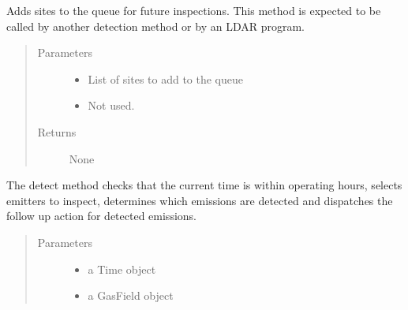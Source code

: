 \documentclass[letterpaper,10pt,english]{sphinxmanual}
\begin{document}
\begin{fulllineitems}
\begin{fulllineitems}
\label{\detokenize{index:feast.DetectionModules.comp_survey.CompSurvey.action}}
Adds sites to the queue for future inspections. This method is expected to be called by another detection
method or by an LDAR program.
\begin{quote}\begin{description}
\item[{Parameters}] \leavevmode\begin{itemize}
\item {} 
 \textendash{} List of sites to add to the queue

\item {} 
 \textendash{} Not used.

\end{itemize}

\item[{Returns}] \leavevmode
None

\end{description}\end{quote}

\end{fulllineitems}


\begin{fulllineitems}
\label{\detokenize{index:feast.DetectionModules.comp_survey.CompSurvey.detect}}
The detect method checks that the current time is within operating hours, selects emitters to inspect,
determines which emissions are detected and dispatches the follow up action for detected emissions.
\begin{quote}\begin{description}
\item[{Parameters}] \leavevmode\begin{itemize}
\item {} 
 \textendash{} a Time object

\item {} 
 \textendash{} a GasField object


\end{itemize}
\end{description}
\end{quote}
\end{fulllineitems}
\end{fulllineitems}
\end{document}
